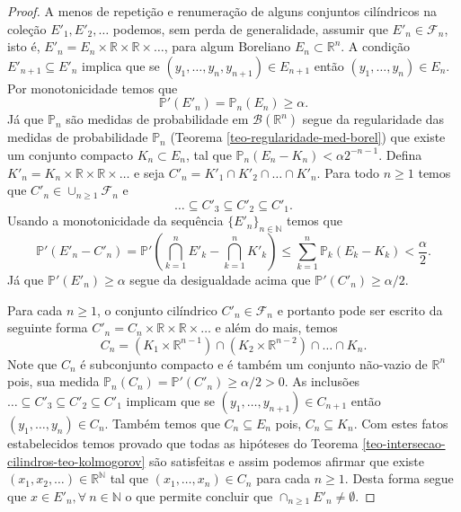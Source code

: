 \begin{proof}
A menos de repetição e renumeração de alguns conjuntos 
cilíndricos na coleção $E'_1,E'_2,\ldots $ 
podemos, sem perda de generalidade, assumir que 
$E'_n\in\mathcal{F}_n$, isto é, 
$E'_n=E_n\times\mathbb{R}\times\mathbb{R}\times\ldots$,
para algum Boreliano $E_n\subset \mathbb{R}^n$. 
A condição $E'_{n+1}\subseteq E'_{n}$ implica que se
$(y_1,\ldots, y_n,y_{n+1})\in E_{n+1}$ então 
$(y_1,\ldots, y_n)\in E_{n}$. 
Por monotonicidade temos que 
\[
\mathbb{P}'(E'_n) = \mathbb{P}_{n}(E_n)\geq \alpha.
\]
Já que $\mathbb{P}_n$ são medidas de probabilidade em 
$\mathscr{B}(\mathbb{R}^n)$ segue da regularidade das 
medidas de probabilidade $\mathbb{P}_n$ 
(Teorema \ref{teo-regularidade-med-borel}) que existe
um conjunto compacto $K_n\subset E_n$, tal que 
$\mathbb{P}_{n}(E_n-K_n)<\alpha 2^{-n-1}$.
Defina $K'_n = K_n\times \mathbb{R}\times\mathbb{R}\times\ldots$
e seja $C'_n = K'_1\cap K'_2\cap\ldots\cap K'_n$. Para todo $n\geq 1$ 
temos que $C'_n\in \cup_{n\geq 1}\mathcal{F}_n$ e 
\[
\ldots\subseteq C'_3\subseteq C'_2\subseteq C'_1.
\]
Usando a monotonicidade da sequência $\{E'_n\}_{n\in\mathbb{N}}$ 
temos que 
\[
\mathbb{P}'(E'_n-C'_n)
=
\mathbb{P}'\left( \bigcap_{k=1}^n E'_k- \bigcap_{k=1}^n K'_k \right)
\leq
\sum_{k=1}^{n} \mathbb{P}_{k}(E_k-K_k)
<
\frac{\alpha}{2}.
\]
Já que $\mathbb{P}'(E'_n)\geq \alpha$ segue da desigualdade 
acima que $\mathbb{P}'(C'_n)\geq \alpha/2$.

Para cada $n\geq 1$, o conjunto cilíndrico 
$C'_n\in\mathcal{F}_n$ e portanto 
pode ser escrito da seguinte forma
$C'_n= C_n\times\mathbb{R}\times\mathbb{R}\times\ldots$ e 
além do mais, temos  
\[
C_n 
= 
(K_1\times\mathbb{R}^{n-1})
\cap 
(K_2\times\mathbb{R}^{n-2})
\cap
\ldots
\cap
K_n.
\]
Note que $C_n$ é subconjunto compacto e é também  
um conjunto não-vazio de $\mathbb{R}^n$ pois, sua medida 
$\mathbb{P}_{n}(C_n)=\mathbb{P}'(C'_n)\geq \alpha/2>0.$
As inclusões $\ldots\subseteq C'_3\subseteq C'_2\subseteq C'_1$
implicam que se $(y_1,\ldots,y_{n+1})\in C_{n+1}$ 
então $(y_1,\ldots,y_{n})\in C_n$. 
Também temos que $C_n\subseteq E_n$ pois, $C_n\subseteq K_n$.
Com estes fatos estabelecidos 
temos provado que todas as hipóteses do 
Teorema \ref{teo-intersecao-cilindros-teo-kolmogorov}
são satisfeitas e assim podemos afirmar que existe 
$(x_1,x_2,\ldots)\in\mathbb{R}^{\mathbb{N}}$ tal que 
$(x_1,\ldots,x_n)\in C_n$ para cada $n\geq 1$.
Desta forma segue que $x\in E'_n, \forall\ n\in\mathbb{N}$
o que permite concluir que $\cap_{n\geq 1} E'_n\neq \emptyset$.
\end{proof}









